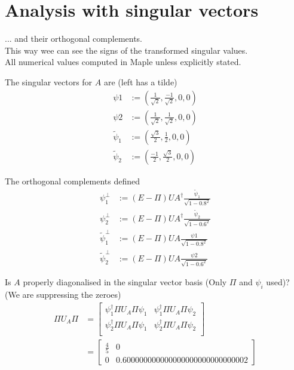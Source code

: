 \documentclass{article}
\begin{document}
%
%
\newpage
\section*{Analysis with singular vectors}


\noindent ... and their orthogonal complements. \\
\noindent This way wee can see the signs of the transformed singular values.\\
\noindent All numerical values computed in Maple unless explicitly stated.

\noindent The singular vectors for $A$ are (left has a tilde)
\begin{align*}
\psi 1 & := \left( \frac{1}{\sqrt{2}}, \frac{-1}{\sqrt{2}}, 0, 0 \right)\\
\psi 2 & := \left( \frac{1}{\sqrt{2}}, \frac{1}{\sqrt{2}}, 0, 0 \right) \\
\tilde{\psi}_1 & := \left( \frac{\sqrt{3}}{2}, \frac{1}{2}, 0, 0 \right)\\
\tilde{\psi}_2 & := \left( \frac{-1}{2}, \frac{\sqrt{3}}{2}, 0, 0 \right)
\end{align*}

\noindent The orthogonal complements defined
\begin{align*}
\psi_1^{\perp} & := (E - \Pi) UA^{\dagger} \frac{\tilde{\psi}_1}{\sqrt{1 - 0.8^2}}  \\
\psi_2^{\perp} & := (E - \Pi) UA^{\dagger}  \frac{\tilde{\psi}_2}{\sqrt{1 - 0.6^2}} \\
\tilde{\psi}_1^{\perp} & := (E - \Pi)  UA  \frac{\psi 1}{\sqrt{1 - 0.8^2}} \\
\tilde{\psi}_2^{\perp} & := (E - \Pi)  UA  \frac{\psi 2}{\sqrt{1 - 0.6^2}} 
\end{align*}

\noindent Is $A$ properly diagonalised in the singular vector basis (Only $\Pi$ and $\psi_i$ used)?\\
(We are suppressing the zeroes)
\begin{align*}
\Pi U_A \Pi  & = \begin{bmatrix}
			{\psi}_1^{\dagger} \Pi U_A \Pi \psi_1 & {\psi}_1^{\dagger} \Pi U_A \Pi \psi_2 \\ 
			{\psi}_2^{\dagger} \Pi U_A \Pi \psi_1 & {\psi}_2^{\dagger} \Pi U_A \Pi \psi_2 \\
		\end{bmatrix}\\
	& = \begin{bmatrix} \frac{4}{5} & 0 \\ 0 & 0.600000000000000000000000000002 \end{bmatrix}
\end{align*}
\end{document}
